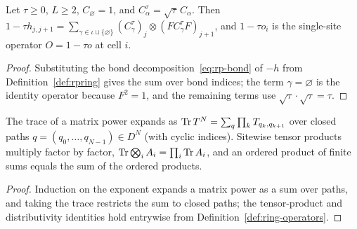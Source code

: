 \begin{lemma}
  \label{lem:bond-expansion}
  \leanok
  Let \(\tau \ge 0\), \(L \ge 2\), \(C_{\varnothing} = 1\), and \(C_\alpha^\tau = \sqrt\tau\,
  C_\alpha\). Then
  \(1 - \tau h_{j,j+1} = \sum_{\gamma \in \iota \sqcup \{\varnothing\}} (C^\tau_\gamma)_j \otimes
  (F C^\tau_\gamma F)_{j+1}\), and \(1 - \tau o_i\) is the single-site operator \(O = 1 - \tau o\)
  at cell \(i\).
\end{lemma}
\begin{proof}
  \leanok
  Substituting the bond decomposition~\eqref{eq:rp-bond} of \(-h\) from Definition~\ref{def:rpring}
  gives the sum over bond indices; the term \(\gamma = \varnothing\) is the identity operator
  because \(F^2 = 1\), and the remaining terms use \(\sqrt\tau \cdot \sqrt\tau = \tau\).
\end{proof}

\begin{lemma}
  \label{lem:closed-path}
  \leanok
  The trace of a matrix power expands as \(\operatorname{Tr} T^N = \sum_{q} \prod_{k} T_{q_k, q_{k+1}}\) over
  closed paths \(q = (q_0, \dots, q_{N-1}) \in D^N\) (with cyclic indices). Sitewise tensor
  products multiply factor by factor, \(\operatorname{Tr} \bigotimes_i A_i = \prod_i \operatorname{Tr} A_i\), and an ordered
  product of finite sums equals the sum of the ordered products.
\end{lemma}
\begin{proof}
  \leanok
  Induction on the exponent expands a matrix power as a sum over paths, and taking the trace
  restricts the sum to closed paths; the tensor-product and distributivity identities hold
  entrywise from Definition~\ref{def:ring-operators}.
\end{proof}

